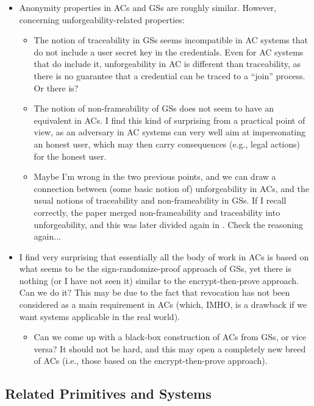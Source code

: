 \begin{itemize}
\item Anonymity properties in ACs and GSs are roughly similar. However, concerning
  unforgeability-related properties:
  \begin{itemize}
  \item The notion of traceability in GSs seems incompatible in AC systems that
    do not include a user secret key in the credentials. Even for AC systems that
    do include it, unforgeability in AC is different than traceability, as there
    is no guarantee that a credential can be traced to a ``join'' process. Or
    there is?
  \item The notion of non-frameability of GSs does not seem to have an equivalent
    in ACs. I find this kind of surprising from a practical point of view, as an
    adversary in AC systems can very well aim at impersonating an honest user,
    which may then carry consequences (e.g., legal actions) for the honest user.
  \item Maybe I'm wrong in the two previous points, and we can draw a connection
    between (some basic notion of) unforgeability in ACs, and the usual notions
    of traceability and non-frameability in GSs. If I recall correctly, the
    \cite{bmw03} paper merged non-frameability and traceability into
    unforgeability, and this was later divided again in \cite{bsz05}. Check the
    reasoning again...
  \end{itemize}  
\item I find very surprising that essentially all the body of work in ACs is
  based on what seems to be the sign-randomize-proof approach of GSs, yet there
  is nothing (or I have not seen it) similar to the encrypt-then-prove approach.
  Can we do it? This may be due to the fact that revocation has not been
  considered as a main requirement in ACs (which, IMHO, is a drawback if we want
  systems applicable in the real world).
  \begin{itemize}
  \item Can we come up with a black-box construction of ACs from GSs, or vice
    versa? It should not be hard, and this may open a completely new breed of
    ACs (i.e., those based on the encrypt-then-prove approach).
  \end{itemize}
\end{itemize}

\subsection{Related Primitives and Systems}
\label{ssec:acrelated}

